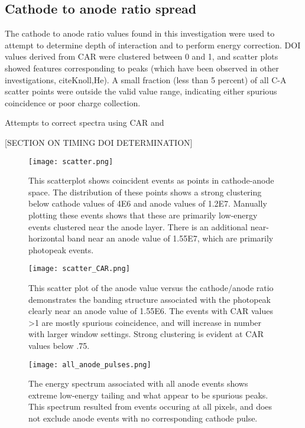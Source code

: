 \subsection{Cathode to anode ratio spread}

The cathode to anode ratio values found in this investigation were used to attempt to determine depth of interaction and to perform energy correction. DOI values derived from CAR were clustered between 0 and 1, and scatter plots showed features corresponding to peaks (which have been observed in other investigations, cite{Knoll,He}). A small fraction (less than 5 percent) of all C-A scatter points were outside the valid value range, indicating either spurious coincidence or poor charge collection. 

Attempts to correct spectra using CAR and 

[SECTION ON TIMING DOI DETERMINATION]


\begin{figure}[h!]
\begin{center}
\texttt{[image: scatter.png]}
\caption{This scatterplot shows coincident events as points in cathode-anode space. The distribution of these points shows a strong clustering below cathode values of 4E6 and anode values of 1.2E7. Manually plotting these events shows that these are primarily low-energy events clustered near the anode layer. There is an additional near-horizontal band near an anode value of 1.55E7, which are primarily photopeak events. }
\label{rt}
\end{center}
\end{figure}
\clearpage



\begin{figure}[h!]
\begin{center}
\texttt{[image: scatter\_CAR.png]}
\caption{This scatter plot of the anode value versus the cathode/anode ratio demonstrates the banding structure associated with the photopeak clearly near an anode value of 1.55E6. The events with CAR values >1 are mostly spurious coincidence, and will increase in number with larger window settings. Strong clustering is evident at CAR values below .75.}
\label{Ori}
\end{center}
\end{figure}



\begin{figure}[h!]
\begin{center}
\texttt{[image: all\_anode\_pulses.png]}
\caption{The energy spectrum associated with all anode events shows extreme low-energy tailing and what appear to be spurious peaks. This spectrum resulted from events occuring at all pixels, and does not exclude anode events with no corresponding cathode pulse. }
\label{400}
\end{center}
\end{figure}


